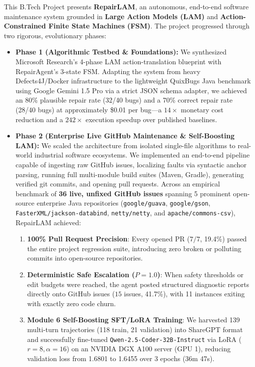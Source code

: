 \documentclass[12pt,a4paper]{report}
\begin{document}
This B.Tech Project presents \textbf{RepairLAM}, an autonomous, end-to-end software maintenance system grounded in \textbf{Large Action Models (LAM)} and \textbf{Action-Constrained Finite State Machines (FSM)}. The project progressed through two rigorous, evolutionary phases:
\begin{itemize}
    \item \textbf{Phase 1 (Algorithmic Testbed \& Foundations):} We synthesized Microsoft Research's 4-phase LAM action-translation blueprint with RepairAgent's 3-state FSM. Adapting the system from heavy Defects4J/Docker infrastructure to the lightweight QuixBugs Java benchmark using Google Gemini 1.5 Pro via a strict JSON schema adapter, we achieved an 80\% plausible repair rate (32/40 bugs) and a 70\% correct repair rate (28/40 bugs) at approximately \$0.01 per bug---a $14\times$ monetary cost reduction and a $242\times$ execution speedup over published baselines.
    \item \textbf{Phase 2 (Enterprise Live GitHub Maintenance \& Self-Boosting LAM):} We scaled the architecture from isolated single-file algorithms to real-world industrial software ecosystems. We implemented an end-to-end pipeline capable of ingesting raw GitHub issues, localizing faults via syntactic anchor parsing, running full multi-module build suites (Maven, Gradle), generating verified git commits, and opening pull requests. Across an empirical benchmark of \textbf{36 live, unfixed GitHub issues} spanning 5 prominent open-source enterprise Java repositories (\texttt{google/guava}, \texttt{google/gson}, \texttt{FasterXML/jackson-databind}, \texttt{netty/netty}, and \texttt{apache/commons-csv}), RepairLAM achieved:
    \begin{enumerate}
        \item \textbf{100\% Pull Request Precision}: Every opened PR ($7/7$, 19.4\%) passed the entire project regression suite, introducing zero broken or polluting commits into open-source repositories.
        \item \textbf{Deterministic Safe Escalation ($P = 1.0$)}: When safety thresholds or edit budgets were reached, the agent posted structured diagnostic reports directly onto GitHub issues ($15$ issues, 41.7\%), with 11 instances exiting with exactly zero code churn.
        \item \textbf{Module 6 Self-Boosting SFT/LoRA Training}: We harvested 139 multi-turn trajectories (118 train, 21 validation) into ShareGPT format and successfully fine-tuned \texttt{Qwen-2.5-Coder-32B-Instruct} via LoRA ($r=8, \alpha=16$) on an NVIDIA DGX A100 server (GPU 1), reducing validation loss from 1.6801 to 1.6455 over 3 epochs (36m 47s).

\end{enumerate}
\end{itemize}
\end{document}
